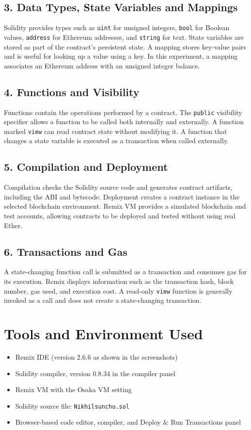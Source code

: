 \documentclass[12pt,a4paper]{article}
\begin{document}
\subsection{3. Data Types, State Variables and Mappings}
Solidity provides types such as \texttt{uint} for unsigned integers, \texttt{bool} for Boolean values, \texttt{address} for Ethereum addresses, and \texttt{string} for text. State variables are stored as part of the contract's persistent state. A mapping stores key-value pairs and is useful for looking up a value using a key. In this experiment, a mapping associates an Ethereum address with an unsigned integer balance.

\subsection{4. Functions and Visibility}
Functions contain the operations performed by a contract. The \texttt{public} visibility specifier allows a function to be called both internally and externally. A function marked \texttt{view} can read contract state without modifying it. A function that changes a state variable is executed as a transaction when called externally.

\subsection{5. Compilation and Deployment}
Compilation checks the Solidity source code and generates contract artifacts, including the ABI and bytecode. Deployment creates a contract instance in the selected blockchain environment. Remix VM provides a simulated blockchain and test accounts, allowing contracts to be deployed and tested without using real Ether.

\subsection{6. Transactions and Gas}
A state-changing function call is submitted as a transaction and consumes gas for its execution. Remix displays information such as the transaction hash, block number, gas used, and execution cost. A read-only \texttt{view} function is generally invoked as a call and does not create a state-changing transaction.

\section{Tools and Environment Used}
\begin{itemize}
    \item Remix IDE (version 2.6.6 as shown in the screenshots)
    \item Solidity compiler, version 0.8.34 in the compiler panel
    \item Remix VM with the Osaka VM setting
    \item Solidity source file: \texttt{Nikhilsunchu.sol}
    \item Browser-based code editor, compiler, and Deploy \& Run Transactions panel
\end{itemize}
\end{document}
